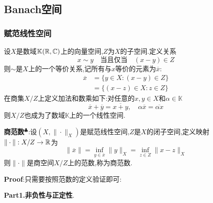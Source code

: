 \newpage
\subsection{Banach空间}
\subsubsection{赋范线性空间}
设$X$是数域$\mathbb{K}(\mathbb{R},\mathbb{C})$上的向量空间,$Z$为$X$的子空间.定义关系
$$
x\sim y\quad \text{当且仅当}\quad (x-y)\in Z
$$
则$\sim$是$X$上的一个等价关系,记所有与$x$等价的元素为$\overline{x}$:
$$
\begin{aligned}
    \overline{x} &= \{y\in X:(x-y)\in Z\}\\
                 &= \{(x-z)\in X:z\in Z\}
\end{aligned}
$$
在商集$X/Z$上定义加法和数乘如下:对任意的$x,y\in X$和$\alpha\in\mathbb{K}$
$$
\overline{x}+\overline{y}=\overline{x+y},\quad \alpha\overline{x}=\overline{\alpha x}
$$
则$X/Z$也成为了数域$\mathbb{K}$上的一个线性空间.\par
\textbf{商范数}$^\clubsuit $:设$(X,\|\cdot\|_{X})$是赋范线性空间,$Z$是$X$的闭子空间,定义映射$\|\cdot\|:X/Z\to\mathbb{R}$为
$$
\|\overline{x}\|=\inf_{y\in\overline{x}}\|y\|_{X}=\inf_{z\in Z}\|x-z\|_{X}
$$
则$\|\cdot\|$是商空间$X/Z$上的范数,称为商范数.\par
\textbf{Proof}:只需要按照范数的定义验证即可:\par
\textbf{Part1.非负性与正定性}.\par

